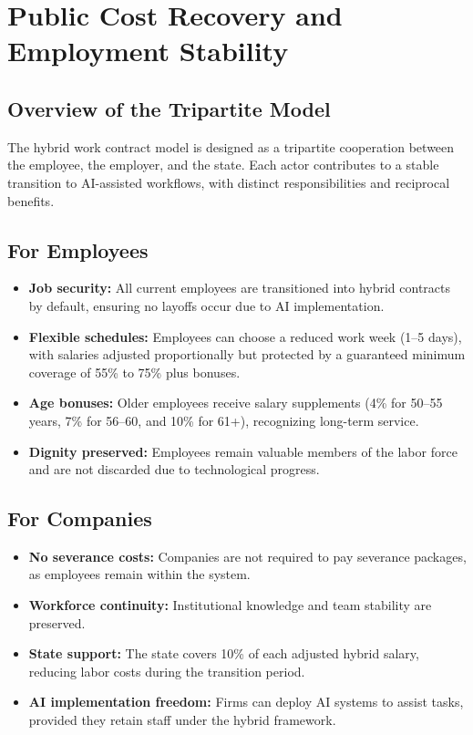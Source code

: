 \documentclass[12pt]{article}
\begin{document}
\section{Public Cost Recovery and Employment Stability}

\subsection{Overview of the Tripartite Model}

The hybrid work contract model is designed as a tripartite cooperation between the employee, the employer, and the state. Each actor contributes to a stable transition to AI-assisted workflows, with distinct responsibilities and reciprocal benefits.

\subsection{For Employees}

\begin{itemize}
  \item \textbf{Job security:} All current employees are transitioned into hybrid contracts by default, ensuring no layoffs occur due to AI implementation.
  \item \textbf{Flexible schedules:} Employees can choose a reduced work week (1–5 days), with salaries adjusted proportionally but protected by a guaranteed minimum coverage of 55\% to 75\% plus bonuses.
  \item \textbf{Age bonuses:} Older employees receive salary supplements (4\% for 50–55 years, 7\% for 56–60, and 10\% for 61+), recognizing long-term service.
  \item \textbf{Dignity preserved:} Employees remain valuable members of the labor force and are not discarded due to technological progress.
\end{itemize}

\subsection{For Companies}

\begin{itemize}
  \item \textbf{No severance costs:} Companies are not required to pay severance packages, as employees remain within the system.
  \item \textbf{Workforce continuity:} Institutional knowledge and team stability are preserved.
  \item \textbf{State support:} The state covers 10\% of each adjusted hybrid salary, reducing labor costs during the transition period.
  \item \textbf{AI implementation freedom:} Firms can deploy AI systems to assist tasks, provided they retain staff under the hybrid framework.
\end{itemize}
\end{document}

